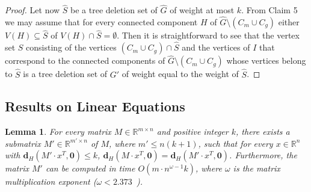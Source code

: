\documentclass[a4paper,11pt]{article}
\newtheorem{lemma}{Lemma}
\newcommand{\hd}{\textbf{d}_{H}}
\begin{document}
\begin{proof}
Let now $\widehat{S}$ be a tree deletion set of $\widehat{G}$ of weight at most $k$. From Claim 5 we may assume that for every connected component $H$ of 
$\widehat{G}\setminus (C_{m}\cup C_{g})$ either $V(H)\subseteq \widehat{S}$ of $V(H)\cap \widehat{S}=\emptyset$.
Then it is straightforward to see that the vertex set $S$ consisting of the vertices $(C_{m}\cup C_{g})\cap\widehat{S}$ and the vertices of $I$ that correspond to the
connected components of $\widehat{G}\setminus (C_{m}\cup C_{g})$ whose vertices belong to $\widehat{S}$ is a tree deletion set of $G'$ of weight equal to the weight 
of $\widehat{S}$.
\end{proof}

\subsection{Results on Linear Equations}\label{subsct:lnreqtns}

\begin{lemma}\label{mtrx1lem}
For every matrix $M\in\mathbb{R}^{m\times n}$ and positive integer $k$, there exists a submatrix $M'\in \mathbb{R}^{m'\times n}$ of $M$, 
where $m'\leq n(k+1)$, such that for every $x\in \mathbb{R}^{n}$ with $\hd(M'\cdot x^{T},\mathbf{0})\leq k$, $\hd(M\cdot x^{T},\mathbf{0})=\hd(M'\cdot x^{T},\mathbf{0})$. 
Furthermore, the matrix $M'$ can be computed in time $O(m\cdot n^{\omega-1}k)$, where $\omega$ is the matrix multiplication exponent ($\omega<2.373$~\cite{Williams12}).
\end{lemma}
\end{document}
